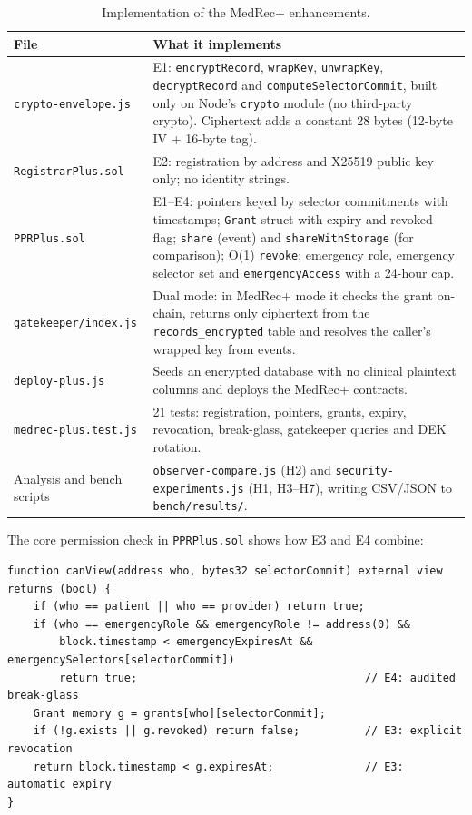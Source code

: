 \documentclass[11pt,a4paper]{article}
\begin{document}
\begin{table}[H]
\centering\small
\caption{Implementation of the MedRec+ enhancements.}
\label{tab:impl}
\begin{tabularx}{\linewidth}{@{}p{4.0cm} Y@{}}
\toprule
\textbf{File} & \textbf{What it implements} \\
\midrule
\texttt{crypto-envelope.js} & E1: \texttt{encryptRecord}, \texttt{wrapKey}, \texttt{unwrapKey}, \texttt{decryptRecord} and \texttt{computeSelectorCommit}, built only on Node's \texttt{crypto} module (no third-party crypto). Ciphertext adds a constant 28 bytes (12-byte IV + 16-byte tag). \\
\texttt{RegistrarPlus.sol} & E2: registration by address and X25519 public key only; no identity strings. \\
\texttt{PPRPlus.sol} & E1--E4: pointers keyed by selector commitments with timestamps; \texttt{Grant} struct with expiry and revoked flag; \texttt{share} (event) and \texttt{shareWithStorage} (for comparison); O(1) \texttt{revoke}; emergency role, emergency selector set and \texttt{emergencyAccess} with a 24-hour cap. \\
\texttt{gatekeeper/index.js} & Dual mode: in MedRec+ mode it checks the grant on-chain, returns only ciphertext from the \texttt{records\_encrypted} table and resolves the caller's wrapped key from events. \\
\texttt{deploy-plus.js} & Seeds an encrypted database with no clinical plaintext columns and deploys the MedRec+ contracts. \\
\texttt{medrec-plus.test.js} & 21 tests: registration, pointers, grants, expiry, revocation, break-glass, gatekeeper queries and DEK rotation. \\
Analysis and bench scripts & \texttt{observer-compare.js} (H2) and \texttt{security-experiments.js} (H1, H3--H7), writing CSV/JSON to \texttt{bench/results/}. \\
\bottomrule
\end{tabularx}
\end{table}

The core permission check in \texttt{PPRPlus.sol} shows how E3 and E4 combine:

\begin{footnotesize}
\begin{verbatim}
function canView(address who, bytes32 selectorCommit) external view returns (bool) {
    if (who == patient || who == provider) return true;
    if (who == emergencyRole && emergencyRole != address(0) &&
        block.timestamp < emergencyExpiresAt && emergencySelectors[selectorCommit])
        return true;                                   // E4: audited break-glass
    Grant memory g = grants[who][selectorCommit];
    if (!g.exists || g.revoked) return false;          // E3: explicit revocation
    return block.timestamp < g.expiresAt;              // E3: automatic expiry
}
\end{verbatim}
\end{footnotesize}
\end{document}
